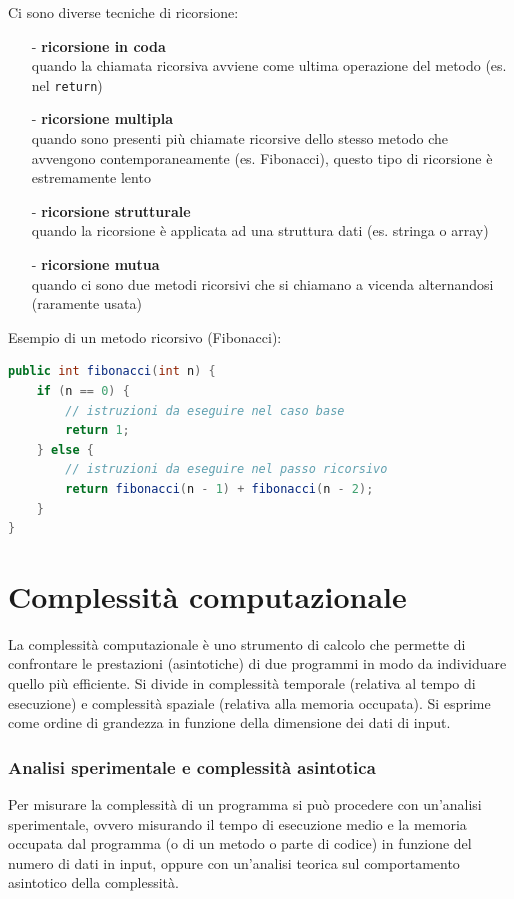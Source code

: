 \documentclass{article}
\begin{document}
Ci sono diverse tecniche di ricorsione:
\begin{itemize}
	\item[-] \textbf{ricorsione in coda} \\
	quando la chiamata ricorsiva avviene come ultima operazione del metodo (es. nel \verb|return|)
	\item[-] \textbf{ricorsione multipla} \\
	quando sono presenti più chiamate ricorsive dello stesso metodo che avvengono contemporaneamente (es. Fibonacci), questo tipo di
	ricorsione è estremamente lento
	\item[-] \textbf{ricorsione strutturale} \\
	quando la ricorsione è applicata ad una struttura dati (es. stringa o array)
	\item[-] \textbf{ricorsione mutua} \\
	quando ci sono due metodi ricorsivi che si chiamano a vicenda alternandosi (raramente usata)
\end{itemize}

Esempio di un metodo ricorsivo (Fibonacci):
\begin{lstlisting}[language=Java]
public int fibonacci(int n) {
	if (n == 0) {
		// istruzioni da eseguire nel caso base
		return 1;
	} else {
		// istruzioni da eseguire nel passo ricorsivo
		return fibonacci(n - 1) + fibonacci(n - 2);
	}
}
\end{lstlisting}


\section{Complessità computazionale}
La complessità computazionale è uno strumento di calcolo che permette di confrontare le prestazioni (asintotiche) di due programmi
in modo da individuare quello più efficiente. Si divide in complessità temporale (relativa al tempo di esecuzione) e complessità
spaziale (relativa alla memoria occupata). Si esprime come ordine di grandezza in funzione della dimensione dei dati di input.

\subsubsection*{Analisi sperimentale e complessità asintotica}
Per misurare la complessità di un programma si può procedere con un'analisi sperimentale, ovvero misurando il tempo di esecuzione
medio e la memoria occupata dal programma (o di un metodo o parte di codice) in funzione del numero di dati in input, oppure con
un'analisi teorica sul comportamento asintotico della complessità.
\end{document}
